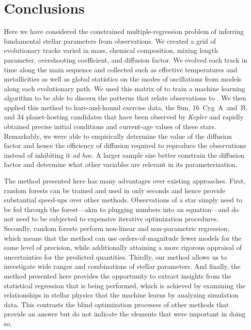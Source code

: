 \section{Conclusions}
Here we have considered the constrained multiple-regression problem of inferring fundamental stellar parameters from observations. We created a grid of evolutionary tracks varied in mass, chemical composition, mixing length parameter, overshooting coefficient, and diffusion  factor. We evolved each track in time along the main sequence and collected  such as effective temperatures and metallicities as well as global statistics on the modes of oscillations from models along each evolutionary path. We used this matrix of  to train a machine learning algorithm to be able to discern the patterns that relate observations to . We then applied this method to hare-and-hound exercise data, the Sun, 16~Cyg~A~and~B, and $34$ planet-hosting candidates that have been observed by \emph{Kepler} and rapidly obtained precise initial conditions and current-age values of these stars. %
Remarkably, we were able to empirically determine the value of the diffusion  factor and hence the efficiency of diffusion required to reproduce the observations instead of inhibiting it \emph{ad hoc}. A larger sample size  better constrain the diffusion  factor and determine what other variables are relevant in its parameterization. 

The method presented here has many advantages over existing approaches. First, random forests can be trained and used in only seconds and hence provide substantial speed-ups over other methods. Observations of a star simply need to be fed through the forest---akin to plugging numbers into an equation---and do not need to be subjected to expensive iterative optimization procedures. 
Secondly, random forests perform non-linear and non-parametric regression, which means that the method can use orders-of-magnitude fewer models for the same level of precision, while additionally attaining a more rigorous appraisal of uncertainties for the predicted quantities. 
Thirdly, our method allows us to investigate wide ranges and combinations of stellar parameters. 
And finally, the method presented here provides the opportunity to extract insights from the statistical regression that is being performed, which is achieved by examining the relationships in stellar physics that the machine learns by analyzing simulation data. This contrasts the blind optimization processes of other methods that provide an answer but do not indicate the elements that were important in doing so. 

